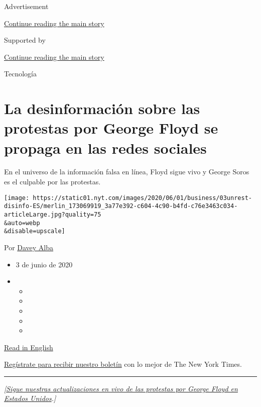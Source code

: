 Advertisement

\protect\hyperlink{after-top}{Continue reading the main story}

Supported by

\protect\hyperlink{after-sponsor}{Continue reading the main story}

Tecnología

\hypertarget{la-desinformaciuxf3n-sobre-las-protestas-por-george-floyd-se-propaga-en-las-redes-sociales}{%
\section{La desinformación sobre las protestas por George Floyd se
propaga en las redes
sociales}\label{la-desinformaciuxf3n-sobre-las-protestas-por-george-floyd-se-propaga-en-las-redes-sociales}}

En el universo de la información falsa en línea, Floyd sigue vivo y
George Soros es el culpable por las protestas.

\texttt{[image: https://static01.nyt.com/images/2020/06/01/business/03unrest-disinfo-ES/merlin\_173069919\_3a77e392-c604-4c90-b4fd-c76e3463c034-articleLarge.jpg?quality=75\\\&auto=webp\\\&disable=upscale]}

Por \href{https://www.nytimes.com/by/davey-alba}{Davey Alba}

\begin{itemize}
\item
  3 de junio de 2020
\item
  \begin{itemize}
  \item
  \item
  \item
  \item
  \item
  \end{itemize}
\end{itemize}

\href{https://www.nytimes.com/2020/06/01/technology/george-floyd-misinformation-online.html}{Read
in English}

\href{https://www.nytimes.com/newsletters/el-times}{Regístrate para
recibir nuestro boletín} con lo mejor de The New York Times.

\begin{center}\rule{0.5\linewidth}{\linethickness}\end{center}

\emph{{[}}\href{https://www.nytimes.com/2020/06/02/us/protests-today-george-floyd.html}{\emph{Sigue
nuestras actualizaciones en vivo de las protestas por George Floyd en
Estados Unidos}}\emph{.{]}}

